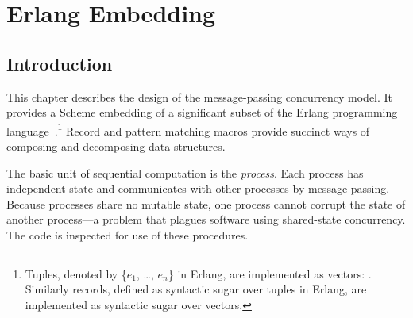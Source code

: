 %
%
%

\chapter {Erlang Embedding}\label{chap:erlang}

\section {Introduction}

This chapter describes the design of the message-passing concurrency
model. It provides a Scheme embedding of a significant subset of the
Erlang programming
language~\cite{armstrong-thesis,programming-erlang}.\footnote{Tuples,
  denoted by \{$e_1$, \ldots, $e_n$\} in Erlang, are implemented as
  vectors: . Similarly
  records, defined as syntactic sugar over tuples in Erlang, are
  implemented as syntactic sugar over vectors.}  Record and pattern
matching macros provide succinct ways of composing and decomposing
data structures.

The basic unit of sequential computation is the \emph{process}.  Each
process has independent state and communicates with other processes by
message passing. Because processes share no mutable state, one process
cannot corrupt the state of another process---a problem that plagues
software using shared-state concurrency.  \mitigation The code is
inspected for use of these procedures.

